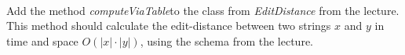  \\
Add the method \emph{computeViaTable}to the class from \emph{EditDistance} from 
the lecture.
This method should calculate the edit-distance between two strings $x$ and $y$ 
in time and space $O(|x|\cdot|y|)$, using the schema from the lecture.
